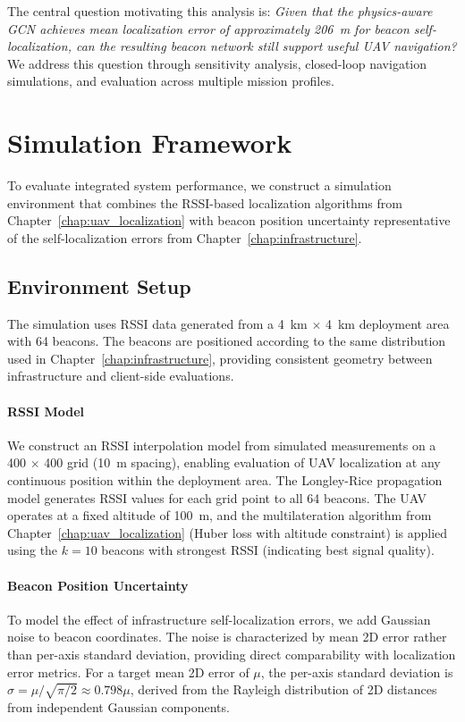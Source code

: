 \documentclass[master,final,11pt]{iscs-thesis}
\begin{document}
The central question motivating this analysis is: \textit{Given that the physics-aware GCN achieves mean localization error of approximately 206~m for beacon self-localization, can the resulting beacon network still support useful UAV navigation?}
We address this question through sensitivity analysis, closed-loop navigation simulations, and evaluation across multiple mission profiles.

\section{Simulation Framework}
\label{sec:integration_framework}

To evaluate integrated system performance, we construct a simulation environment that combines the RSSI-based localization algorithms from Chapter~\ref{chap:uav_localization} with beacon position uncertainty representative of the self-localization errors from Chapter~\ref{chap:infrastructure}.

\subsection{Environment Setup}

The simulation uses RSSI data generated from a 4~km $\times$ 4~km deployment area with 64 beacons.
The beacons are positioned according to the same distribution used in Chapter~\ref{chap:infrastructure}, providing consistent geometry between infrastructure and client-side evaluations.

\paragraph{RSSI Model}
We construct an RSSI interpolation model from simulated measurements on a 400 $\times$ 400 grid (10~m spacing), enabling evaluation of UAV localization at any continuous position within the deployment area.
The Longley-Rice propagation model generates RSSI values for each grid point to all 64 beacons.
The UAV operates at a fixed altitude of 100~m, and the multilateration algorithm from Chapter~\ref{chap:uav_localization} (Huber loss with altitude constraint) is applied using the $k=10$ beacons with strongest RSSI (indicating best signal quality).

\paragraph{Beacon Position Uncertainty}
To model the effect of infrastructure self-localization errors, we add Gaussian noise to beacon coordinates.
The noise is characterized by mean 2D error rather than per-axis standard deviation, providing direct comparability with localization error metrics.
For a target mean 2D error of $\mu$, the per-axis standard deviation is $\sigma = \mu / \sqrt{\pi/2} \approx 0.798\mu$, derived from the Rayleigh distribution of 2D distances from independent Gaussian components.
\end{document}
